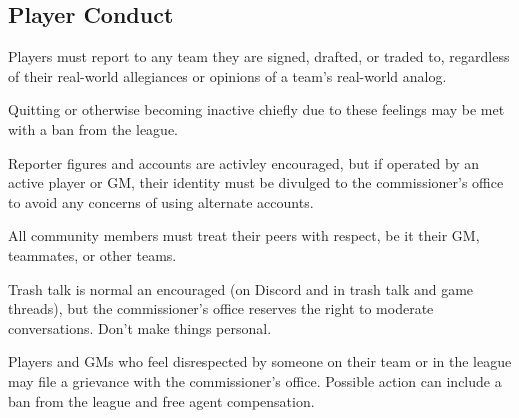 \subsection{Player Conduct}
\begin{deepEnumerate}
	\item Players must report to any team they are signed, drafted, or traded to,
	regardless of their real-world allegiances or opinions of a team's real-world analog.
	\begin{deepEnumerate}
		\item Quitting or otherwise becoming inactive 
		chiefly due to these feelings
		may be met with a ban from the league.
	\end{deepEnumerate}
	\item Reporter figures and accounts are activley encouraged,
	but if operated by an active player or GM,
	their identity must be divulged to the commissioner’s office
	to avoid any concerns of using alternate accounts.
	\item All community members must treat their peers with respect,
	be it their GM, teammates, or other teams.
	\begin{deepEnumerate}
		\item Trash talk is normal an encouraged
		(on Discord and in trash talk and game threads),
		but the commissioner’s office reserves the right to moderate conversations.
		Don't make things personal.
		\item Players and GMs who feel disrespected by someone on their team or in the league 
		may file a grievance with the commissioner’s office.
		Possible action can include a ban from the league and free agent compensation.
	\end{deepEnumerate}
\end{deepEnumerate}
